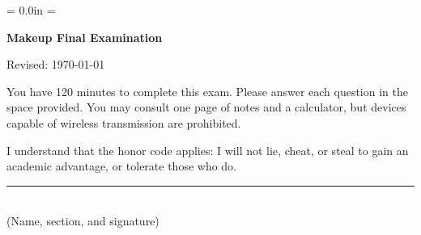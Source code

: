 \documentclass[letterpaper,12pt]{exam}
\def\HeadName{Makeup Final Examination}
\begin{document}
\parindent = 0.0in
\parskip = \bigskipamount
\thispagestyle{empty}%
\Head

\centerline{\large \bf \HeadName}%
\centerline{Revised:  \today}

\bigskip
You have 120 minutes to complete this exam.  Please answer each question in the space provided.
You may consult one page of notes and a calculator, but devices capable of wireless transmission
are prohibited.

I understand that the honor code applies: I will not lie, cheat, or
steal to gain an academic advantage, or tolerate those who do.

\begin{flushright}
\rule{4in}{0.5pt} \\ (Name, section, and signature)
\end{flushright}
\end{document}
